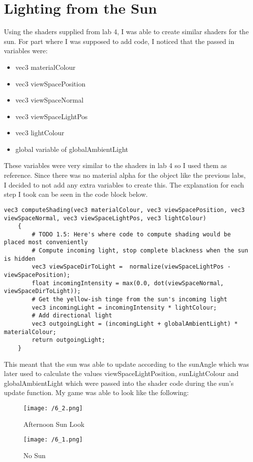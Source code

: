 \documentclass[11pt, oneside, a4paper]{article}
\begin{document}
\section{Lighting from the Sun}
Using the shaders supplied from lab 4, I was able to create similar shaders for the sun. For part where I was supposed to add code, I noticed that the passed in variables were:
\begin{itemize}
	\item{vec3 materialColour}
	\item{vec3 viewSpacePosition}
	\item{vec3 viewSpaceNormal}
	\item{vec3 viewSpaceLightPos}
	\item{vec3 lightColour}
	\item{global variable of globalAmbientLight}
\end{itemize}

These variables were very similar to the shaders in lab 4 so I used them as reference. Since there was no material alpha for the object like the previous labs, I decided to not add any extra variables to create this. The explanation for each step I took can be seen in the code block below.

\begin{lstlisting}  
vec3 computeShading(vec3 materialColour, vec3 viewSpacePosition, vec3 viewSpaceNormal, vec3 viewSpaceLightPos, vec3 lightColour)
    {
        # TODO 1.5: Here's where code to compute shading would be placed most conveniently
        # Compute incoming light, stop complete blackness when the sun is hidden
        vec3 viewSpaceDirToLight = 	normalize(viewSpaceLightPos - viewSpacePosition);
        float incomingIntensity = max(0.0, dot(viewSpaceNormal, viewSpaceDirToLight));
        # Get the yellow-ish tinge from the sun's incoming light
        vec3 incomingLight = incomingIntensity * lightColour;
        # Add directional light
        vec3 outgoingLight = (incomingLight + globalAmbientLight) * materialColour;
        return outgoingLight;
    }
\end{lstlisting}

This meant that the sun was able to update according to the sunAngle which was later used to calculate the values viewSpaceLightPosition, sunLightColour and globalAmbientLight which were passed into the shader code during the sun's update function. My game was able to look like the following:

\begin{figure}[H]
    \centering
    \begin{minipage}{0.5\textwidth}
        \centering
        \texttt{[image: /6\_2.png]}
        \caption{Afternoon Sun Look}
    \end{minipage}%
    \begin{minipage}{0.5\textwidth}
        \centering
        \texttt{[image: /6\_1.png]}
        \caption{No Sun}
    \end{minipage}
\end{figure}
\end{document}
